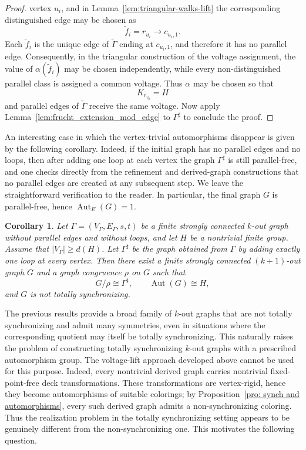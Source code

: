\documentclass[a4paper,10pt]{amsart}
\theoremstyle{plain}
\newtheorem{corollary}[theorem]{Corollary}
\theoremstyle{definition}
\DeclareMathOperator{\Aut}{Aut}
\begin{document}
\begin{proof}
vertex $u_i$, and in Lemma~\ref{lem:triangular-walks-lift} the
corresponding distinguished edge may be chosen as
\[
\widetilde f_i=r_{u_i}\longrightarrow c_{u_i,1}.
\]
Each $\widetilde f_i$ is the unique edge of $\widetilde\Gamma$ ending
at $c_{u_i,1}$, and therefore it has no parallel edge. Consequently,
in the triangular construction of the voltage assignment, the value
of $\alpha(\widetilde f_i)$ may be chosen independently, while every
non-distinguished parallel class is assigned a common voltage.
Thus $\alpha$ may be chosen so that
\[
K_{r_{v_0}}=H
\]
and parallel edges of $\widetilde\Gamma$ receive the same voltage. Now apply Lemma~\ref{lem:frucht_extension_mod_edge} to $\Gamma^\sharp$ to conclude the proof. 
\end{proof}
An interesting case in which the vertex-trivial automorphisms disappear is given by the following corollary. Indeed, if the initial graph has no parallel edges and no loops, then after adding one loop at each vertex the graph $\Gamma^\sharp$ is still parallel-free, and one checks directly from the refinement and derived-graph constructions that no parallel edges are created at any subsequent step. We leave the straightforward verification to the reader. In particular, the final graph $G$ is parallel-free, hence $\Aut_E(G)=1$.
\begin{corollary}\label{cor:one-loop-per-vertex-parallel-free}
Let $\Gamma=(V_\Gamma,E_\Gamma,s,t)$ be a finite strongly connected $k$-out graph without parallel edges and without loops, and let $H$ be a nontrivial finite group. Assume that $|V_\Gamma|\ge d(H)$. Let $\Gamma^\sharp$ be the graph obtained from $\Gamma$ by adding exactly one loop at every vertex. Then there exist a finite strongly connected $(k+1)$-out graph $G$ and a graph congruence $\rho$ on $G$ such that
\[
G/\rho\cong \Gamma^\sharp,\qquad \Aut(G)\cong H,
\]
and $G$ is not totally synchronizing.
\end{corollary}
The previous results provide a broad family of $k$-out graphs that are not totally synchronizing and admit many symmetries, even in situations where the corresponding quotient may itself be totally synchronizing. This naturally raises the problem of constructing totally synchronizing $k$-out graphs with a prescribed automorphism group. The voltage-lift approach developed above cannot be used for this purpose. Indeed, every nontrivial derived graph carries nontrivial fixed-point-free deck transformations. These transformations are vertex-rigid, hence they become automorphisms of suitable colorings; by Proposition~\ref{pro: synch and automorphisms}, every such derived graph admits a non-synchronizing coloring. Thus the realization problem in the totally synchronizing setting appears to be genuinely different from the non-synchronizing one. This motivates the following question.
\end{document}
